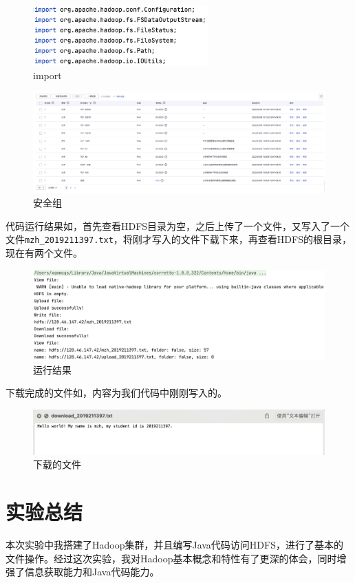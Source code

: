 \documentclass[lang=cn,11pt,a4paper,cite=authornum]{paper}
\begin{document}
\begin{figure}[!htb]
    \centering
    \includegraphics[width=0.6\textwidth]{./images/import.jpg}
    \caption{import\label{fig:import}}
\end{figure}

\begin{figure}[!htb]
    \centering
    \includegraphics[width=\textwidth]{./images/safegroup.jpg}
    \caption{安全组\label{fig:safegroup}}
\end{figure}

代码运行结果如，首先查看HDFS目录为空，之后上传了一个文件，又写入了一个文件\texttt{mzh_2019211397.txt}，将刚才写入的文件下载下来，再查看HDFS的根目录，现在有两个文件。

\begin{figure}[!htb]
    \centering
    \includegraphics[width=\textwidth]{./images/result1.jpg}
    \caption{运行结果\label{fig:result1}}
\end{figure}

下载完成的文件如，内容为我们代码中刚刚写入的。

\begin{figure}[!htb]
    \centering
    \includegraphics[width=\textwidth]{./images/result2.jpg}
    \caption{下载的文件\label{fig:result2}}
\end{figure}

\section{实验总结}

本次实验中我搭建了Hadoop集群，并且编写Java代码访问HDFS，进行了基本的文件操作。经过这次实验，我对Hadoop基本概念和特性有了更深的体会，同时增强了信息获取能力和Java代码能力。
\end{document}
